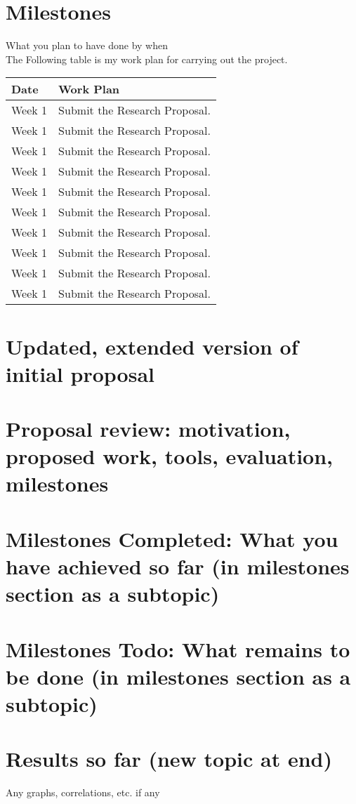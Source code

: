 \section{Milestones}
What you plan to have done by when\\
The Following table is my work plan for carrying out the project.
\begin{center}
	\begin{tabular}{ | l |p{5cm} |}
		\hline
		Date & Work Plan \\ \hline
		Week 1 & Submit the Research Proposal.\\\hline
		Week 1 & Submit the Research Proposal.\\\hline
		Week 1 & Submit the Research Proposal.\\\hline
		Week 1 & Submit the Research Proposal.\\\hline
		Week 1 & Submit the Research Proposal.\\\hline
		Week 1 & Submit the Research Proposal.\\\hline
		Week 1 & Submit the Research Proposal.\\\hline
		Week 1 & Submit the Research Proposal.\\\hline
		Week 1 & Submit the Research Proposal.\\\hline
		Week 1 & Submit the Research Proposal.\\\hline
	\end{tabular}
\end{center}


\section{Updated, extended version of initial proposal}
\section{Proposal review: motivation, proposed work, tools, evaluation, milestones}
\section{Milestones Completed: What you have achieved so far (in milestones section as a
subtopic)}
\section{Milestones Todo: What remains to be done (in milestones section as a subtopic)}
\section{Results so far (new topic at end)}
Any graphs, correlations, etc. if any







